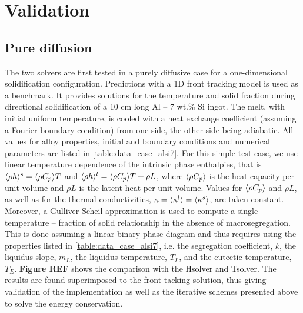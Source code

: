 \section{Validation}
%
\subsection{Pure diffusion}
The two solvers are first tested in a purely diffusive case for a one-dimensional solidification configuration. 
Predictions with a 1D front tracking model \citep{gandin_constrained_2000} is used as a benchmark. It provides 
solutions for the temperature and solid fraction during directional solidification of a 10 cm long Al – 7 wt.\% Si 
ingot. The melt, with initial uniform temperature, is cooled with a heat exchange coefficient (assuming a Fourier 
boundary condition) from one side, the other side being adiabatic. All values for alloy properties, initial and 
boundary conditions and numerical parameters are listed in \autoref{table:data_case_alsi7}. For this simple test case, 
we use linear temperature dependence of the intrinsic phase enthalpies, that is $\langle  \rho h  \rangle^s= \langle  \rho C_p  \rangle T$ and $\langle  \rho h  \rangle^l= \langle  \rho C_p  \rangle T + \rho L$, 
where $\langle  \rho C_p  \rangle$ is the heat capacity per unit volume and $\rho L$ is the latent heat per unit volume. Values for $\langle  \rho C_p  \rangle$ 
and $\rho L$, as well as for the thermal conductivities, $\kappa = \langle \kappa^l \rangle = \langle \kappa^s \rangle$, are taken constant. Moreover, a 
Gulliver Scheil approximation is used to compute a single temperature – fraction of solid relationship in the 
absence of macrosegregation. This is done assuming a linear binary phase diagram and thus requires using the 
properties listed in \autoref{table:data_case_alsi7}, i.e. the segregation coefficient, $k$, the liquidus slope, $m_L$, the 
liquidus temperature, $T_L$, and the eutectic temperature, $T_E$. \textbf{Figure REF} shows the comparison with 
the Hsolver and Tsolver. The results are found superimposed to the front tacking solution, thus giving validation 
of the implementation as well as the iterative schemes presented above to solve the energy conservation.

